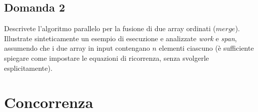 \newpage

\subsection{Domanda 2}
Descrivete l'algoritmo parallelo per la fusione di due array ordinati ($merge$). Illustrate sinteticamente un esempio di esecuzione e analizzate \textit{work} e \textit{span}, assumendo che i due array in input contengano $n$ elementi ciascuno (è sufficiente spiegare come impostare le equazioni di ricorrenza, senza svolgerle esplicitamente).

\newpage

\section{Concorrenza}

